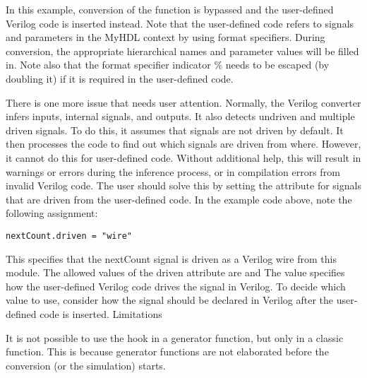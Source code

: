 In this example, conversion of the  function is bypassed and
the user-defined Verilog code is inserted instead. Note that the
user-defined code refers to signals and parameters in the MyHDL
context by using format specifiers. During conversion, the appropriate
hierarchical names and parameter values will be filled in. Note also
that the format specifier indicator \% needs to be escaped (by doubling
it) if it is required in the user-defined code.

There is one more issue that needs user attention. Normally, the
Verilog converter infers inputs, internal signals, and outputs. It
also detects undriven and multiple driven signals. To do this, it
assumes that signals are not driven by default. It then processes the
code to find out which signals are driven from where. However, it
cannot do this for user-defined code. Without additional help, this
will result in warnings or errors during the inference process, or in
compilation errors from invalid Verilog code. The user should solve
this by setting the  attribute for signals that are driven from
the user-defined code. In the example code above, note the following
assignment:

\begin{verbatim}
nextCount.driven = "wire"
\end{verbatim}

This specifies that the nextCount signal is driven as a Verilog wire
from this module. The allowed values of the driven attribute are
 and  The value specifies how the
user-defined Verilog code drives the signal in Verilog. To decide
which value to use, consider how the signal should be declared in
Verilog after the user-defined code is inserted.  Limitations

It is not possible to use the  hook in a generator
function, but only in a classic function. This is because
generator functions are not elaborated before the conversion
(or the simulation) starts.

